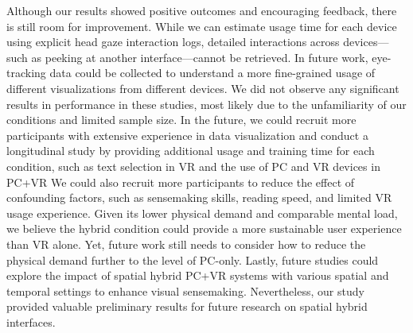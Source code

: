  Although our results showed positive outcomes and encouraging feedback, there is still room for improvement. While we can estimate usage time for each device using explicit head gaze interaction logs, detailed interactions across devices—such as peeking at another interface—cannot be retrieved.
In future work, eye-tracking data could be collected to understand a more fine-grained usage of different visualizations from different devices.
We did not observe any significant results in performance in these studies, most likely due to the unfamiliarity of our conditions and limited sample size.
In the future, we could recruit more participants with extensive experience in data visualization and conduct a longitudinal study by providing additional usage and training time for each condition, such as text selection in VR and the use of PC and VR devices in PC+VR
We could also recruit more participants to reduce the effect of confounding factors, such as sensemaking skills, reading speed, and limited VR usage experience.
Given its lower physical demand and comparable mental load, we believe the hybrid condition could provide a more sustainable user experience than VR alone. 
Yet, future work still needs to consider how to reduce the physical demand further to the level of PC-only. 
Lastly, future studies could explore the impact of spatial hybrid PC+VR systems with various spatial and temporal settings to enhance visual sensemaking.
Nevertheless, our study provided valuable preliminary results for future research on spatial hybrid interfaces.


